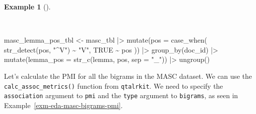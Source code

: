 \documentclass[
  letterpaper,
  DIV=11,
  numbers=noendperiod]{scrreprt}
\newenvironment{Shaded}{\begin{snugshade}}{\end{snugshade}}
\newcommand{\AttributeTok}[1]{\textcolor[rgb]{0.00,0.00,0.00}{#1}}
\newcommand{\ConstantTok}[1]{\textcolor[rgb]{0.00,0.00,0.00}{#1}}
\newcommand{\FunctionTok}[1]{\textcolor[rgb]{0.00,0.00,0.00}{#1}}
\newcommand{\NormalTok}[1]{\textcolor[rgb]{0.00,0.00,0.00}{#1}}
\newcommand{\OtherTok}[1]{\textcolor[rgb]{0.00,0.00,0.00}{#1}}
\newcommand{\SpecialCharTok}[1]{\textcolor[rgb]{0.00,0.00,0.00}{#1}}
\newcommand{\StringTok}[1]{\textcolor[rgb]{0.00,0.00,0.00}{#1}}
\theoremstyle{definition}
\newtheorem{example}{Example}[chapter]
\theoremstyle{remark}
\begin{document}
\begin{example}[]\protect\hypertarget{exm-eda-masc-lemma-pos}{}\label{exm-eda-masc-lemma-pos}

~

\begin{Shaded}
\begin{Highlighting}[]
\NormalTok{masc\_lemma\_pos\_tbl }\OtherTok{\textless{}{-}}
\NormalTok{  masc\_tbl }\SpecialCharTok{|\textgreater{}}
  \FunctionTok{mutate}\NormalTok{(}\AttributeTok{pos =} \FunctionTok{case\_when}\NormalTok{(}
    \FunctionTok{str\_detect}\NormalTok{(pos, }\StringTok{"\^{}V"}\NormalTok{) }\SpecialCharTok{\textasciitilde{}} \StringTok{"V"}\NormalTok{,}
    \ConstantTok{TRUE} \SpecialCharTok{\textasciitilde{}}\NormalTok{ pos}
\NormalTok{  )) }\SpecialCharTok{|\textgreater{}}
  \FunctionTok{group\_by}\NormalTok{(doc\_id) }\SpecialCharTok{|\textgreater{}}
  \FunctionTok{mutate}\NormalTok{(}\AttributeTok{lemma\_pos =} \FunctionTok{str\_c}\NormalTok{(lemma, pos, }\AttributeTok{sep =} \StringTok{"\_"}\NormalTok{)) }\SpecialCharTok{|\textgreater{}}
  \FunctionTok{ungroup}\NormalTok{()}
\end{Highlighting}
\end{Shaded}

\end{example}

Let's calculate the PMI for all the bigrams in the MASC dataset. We can
use the \texttt{calc\_assoc\_metrics()} function from \texttt{qtalrkit}.
We need to specify the \texttt{association} argument to \texttt{pmi} and
the \texttt{type} argument to \texttt{bigrams}, as seen in
Example~\ref{exm-eda-masc-bigrams-pmi}.
\end{document}
